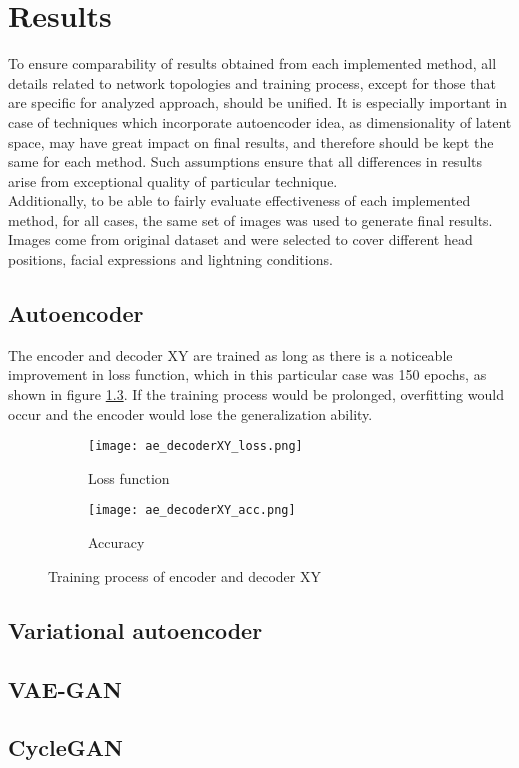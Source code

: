 \chapter{Results}
To ensure comparability of results obtained from each implemented method, all details related to network topologies and training process, except for those that are specific for analyzed approach, should be unified. It is especially important in case of techniques which incorporate autoencoder idea, as dimensionality of latent space, may have great impact on final results, and therefore should be kept the same for each method. Such assumptions ensure that all differences in results arise from exceptional quality of particular technique.\\

Additionally, to be able to fairly evaluate effectiveness of each implemented method, for all cases, the same set of images was used to generate final results. Images come from original dataset and were selected to cover different head positions, facial expressions and lightning conditions.

\section{Autoencoder}
The encoder and decoder XY are trained as long as there is a noticeable improvement in loss function, which in this particular case was 150 epochs, as shown in figure \ref{fig:ae_decoderXY}. If the training process would be prolonged, overfitting would occur and the encoder would lose the generalization ability.

\begin{figure}[H]
\centering
\begin{subfigure}{.5\textwidth}
  \centering
  \texttt{[image: ae\_decoderXY\_loss.png]}
  \caption{Loss function}
  \label{subfig:ae_decoderXY_loss}
\end{subfigure}%
\begin{subfigure}{.5\textwidth}
  \centering
  \texttt{[image: ae\_decoderXY\_acc.png]}
  \caption{Accuracy}
  \label{subfig:ae_decoderXY_acc}
\end{subfigure}
\caption{Training process of encoder and decoder XY}
\label{fig:ae_decoderXY}
\end{figure}

\section{Variational autoencoder}
\section{VAE-GAN}
\section{CycleGAN}